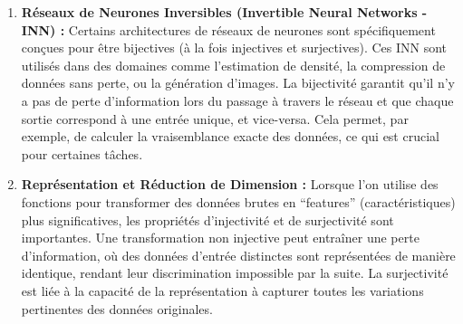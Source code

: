 \documentclass[12pt,a4paper]{report}
\providecommand{\tightlist}{%
  \setlength{\itemsep}{0pt}\setlength{\parskip}{0pt}}
\begin{document}
\begin{enumerate}
  \begin{itemize}
  \tightlist
  \item
    \textbf{Modèles Génératifs (GANs, VAEs) :} Ces modèles apprennent à
    générer de nouvelles données (images, textes, etc.) à partir d'un
    ``espace latent'' (un espace de vecteurs de faible dimension). La
    fonction qui mappe l'espace latent à l'espace des données est une
    application complexe.
  \item
    \textbf{Injectivité :} Si cette application n'est pas injective,
    cela signifie que différents points dans l'espace latent peuvent
    produire la même sortie dans l'espace des données. C'est un problème
    connu sous le nom de ``mode collapse'' dans les GANs, où le
    générateur ne produit qu'une variété limitée d'échantillons,
    ignorant d'autres ``modes'' (types de données) de la distribution
    cible. Une perte d'injectivité implique une perte d'information lors
    de la transformation.
  \item
    \textbf{Surjectivité :} Si l'application de l'espace latent à
    l'espace des données n'est pas surjective (par rapport à la
    distribution de données réelles), cela signifie que le modèle ne
    peut pas générer certains types de données qui existent dans la
    distribution réelle. Le modèle ne couvre pas l'intégralité de
    l'espace des données, ce qui limite sa capacité à produire des
    échantillons diversifiés et réalistes.
  \end{itemize}
\item
  \textbf{Réseaux de Neurones Inversibles (Invertible Neural Networks -
  INN) :} Certains architectures de réseaux de neurones sont
  spécifiquement conçues pour être bijectives (à la fois injectives et
  surjectives). Ces INN sont utilisés dans des domaines comme
  l'estimation de densité, la compression de données sans perte, ou la
  génération d'images. La bijectivité garantit qu'il n'y a pas de perte
  d'information lors du passage à travers le réseau et que chaque sortie
  correspond à une entrée unique, et vice-versa. Cela permet, par
  exemple, de calculer la vraisemblance exacte des données, ce qui est
  crucial pour certaines tâches.
\item
  \textbf{Représentation et Réduction de Dimension :} Lorsque l'on
  utilise des fonctions pour transformer des données brutes en
  ``features'' (caractéristiques) plus significatives, les propriétés
  d'injectivité et de surjectivité sont importantes. Une transformation
  non injective peut entraîner une perte d'information, où des données
  d'entrée distinctes sont représentées de manière identique, rendant
  leur discrimination impossible par la suite. La surjectivité est liée
  à la capacité de la représentation à capturer toutes les variations
  pertinentes des données originales.
\end{enumerate}
\end{document}
